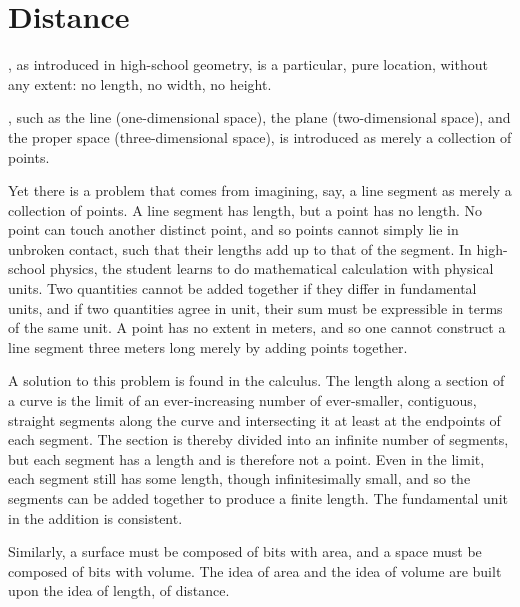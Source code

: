 \documentclass{tufte-book}
\begin{document}


\mainmatter

\chapter{Distance}
\label{ch:distance}

, as introduced in high-school geometry, is a particular,
pure location, without any extent: no length, no width, no height.

, such as the line (one-dimensional
space), the plane (two-dimensional space), and the proper space
(three-dimensional space), is introduced as merely a collection of points.

\bigskip
Yet there is a problem that comes from imagining, say, a line segment as merely
a collection of points.  A line segment has length, but a point has no length.
No point can touch another distinct point, and so points cannot simply lie in
unbroken contact, such that their lengths add up to that of the segment.  In
high-school physics, the student learns to do mathematical calculation with
physical units.  Two quantities cannot be added together if they differ in
fundamental units, and if two quantities agree in unit, their sum must be
expressible in terms of the same unit.
A point has no extent in meters, and so one cannot construct a line segment
three meters long merely by adding points together.

A solution to this problem is found in the calculus.  The length along a
section of a curve is the limit of an ever-increasing number of ever-smaller,
contiguous, straight segments along the curve and intersecting it at least at
the endpoints of each segment.  The section is thereby divided into an infinite
number of segments, but each segment has a length and is therefore not a point.
Even in the limit, each segment still has some length, though infinitesimally
small, and so the segments can be added together to produce a finite length.
The fundamental unit in the addition is consistent.

Similarly, a surface must be composed of bits with area, and a space must be
composed of bits with volume.  The idea of area and the idea of volume are
built upon the idea of length, of distance.
\end{document}
